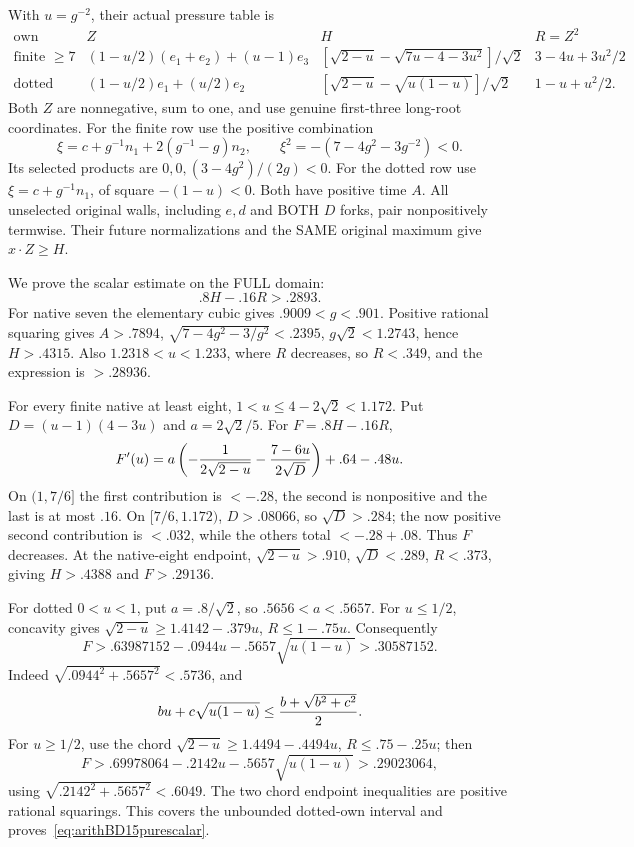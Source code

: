 With \(u=g^{-2}\), their actual pressure table is
\[
\begin{array}{c|c|c|c}
 \text{own}&Z&H&R=Z^2\\ \hline
 \text{finite }\ge7&
 (1-u/2)(e_1+e_2)+(u-1)e_3&
 [\sqrt{2-u}-\sqrt{7u-4-3u^2}]/\sqrt2&
 3-4u+3u^2/2\\
 \text{dotted}&
 (1-u/2)e_1+(u/2)e_2&
 [\sqrt{2-u}-\sqrt{u(1-u)}]/\sqrt2&
 1-u+u^2/2 .
\end{array}
\]
Both \(Z\) are nonnegative, sum to one, and use genuine
first-three long-root coordinates.
For the finite row use the positive combination
\[
 \xi=c+g^{-1}n_1+2(g^{-1}-g)n_2,\qquad
 \xi^2=-(7-4g^2-3g^{-2})<0 .
\]
Its selected products are \(0,0,(3-4g^2)/(2g)<0\).
For the dotted row use
\(\xi=c+g^{-1}n_1\), of square \(-(1-u)<0\).
Both have positive time \(A\).
All unselected original walls, including \(e,d\) and
BOTH \(D\) forks, pair nonpositively termwise.
Their future normalizations and the SAME original
maximum give \(x\cdot Z\ge H\).

We prove the scalar estimate on the FULL domain:
\[
                         .8H-.16R>.2893 .
\tag{R1S}\label{eq:arithBD15purescalar}
\]
For native seven the elementary cubic gives
\(.9009<g<.901\).
Positive rational squaring gives \(A>.7894\),
\(\sqrt{7-4g^2-3/g^2}<.2395\), \(g\sqrt2<1.2743\),
hence \(H>.4315\).
Also \(1.2318<u<1.233\), where \(R\) decreases,
so \(R<.349\), and the expression is \(>.28936\).

For every finite native at least eight,
\(1<u\le4-2\sqrt2<1.172\).
Put \(D=(u-1)(4-3u)\) and \(a=2\sqrt2/5\).
For \(F=.8H-.16R\),
\[
 F'(u)=a\left(-{1\over2\sqrt{2-u}}
             -{7-6u\over2\sqrt D}\right)+.64-.48u .
\]
On \((1,7/6]\) the first contribution is \(<-.28\),
the second is nonpositive and the last is at most \(.16\).
On \([7/6,1.172)\), \(D>.08066\), so \(\sqrt D>.284\);
the now positive second contribution is \(<.032\),
while the others total \(<-.28+.08\).
Thus \(F\) decreases.
At the native-eight endpoint,
\(\sqrt{2-u}>.910\), \(\sqrt D<.289\), \(R<.373\),
giving \(H>.4388\) and \(F>.29136\).

For dotted \(0<u<1\), put \(a=.8/\sqrt2\),
so \(.5656<a<.5657\).
For \(u\le1/2\), concavity gives
\(\sqrt{2-u}\ge1.4142-.379u\), \(R\le1-.75u\).
Consequently
\[
 F>.63987152-.0944u-.5657\sqrt{u(1-u)}
   >.30587152 .
\]
Indeed \(\sqrt{.0944^2+.5657^2}<.5736\), and
\[
 bu+c\sqrt{u(1-u)}
 \le{b+\sqrt{b^2+c^2}\over2}.
\]
For \(u\ge1/2\), use the chord
\(\sqrt{2-u}\ge1.4494-.4494u\), \(R\le.75-.25u\);
then
\[
 F>.69978064-.2142u-.5657\sqrt{u(1-u)}
   >.29023064,
\]
using \(\sqrt{.2142^2+.5657^2}<.6049\).
The two chord endpoint inequalities are positive
rational squarings.
This covers the unbounded dotted-own interval and
proves~\eqref{eq:arithBD15purescalar}.

